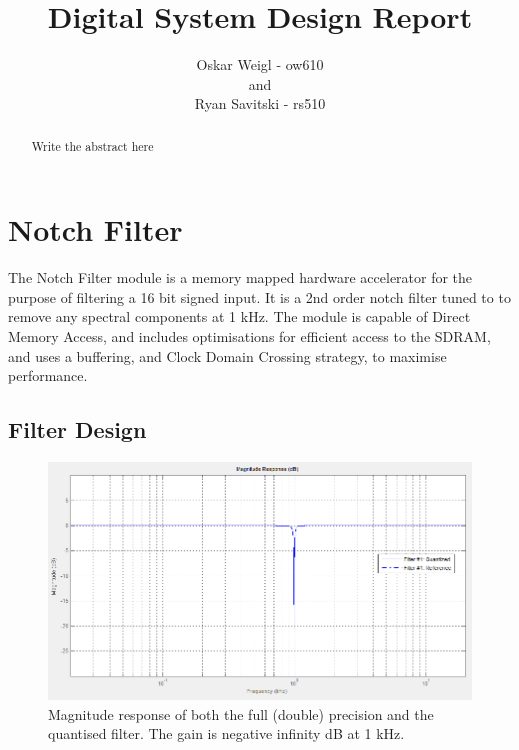 \documentclass[]{article}
\title{Digital System Design Report}
\author{Oskar Weigl - ow610\\ and \\ Ryan Savitski - rs510}
\begin{document}
\maketitle

\begin{abstract}
	Write the abstract here
\end{abstract}

\tableofcontents
\clearpage


\section{Notch Filter} %
\label{sec:notch_filter}

The Notch Filter module is a memory mapped hardware accelerator for the purpose of filtering a 16 bit signed input. It is a 2nd order notch filter tuned to to remove any spectral components at 1 kHz.
The module is capable of Direct Memory Access, and includes optimisations for efficient access to the SDRAM, and uses a buffering, and Clock Domain Crossing strategy, to maximise performance.


\subsection{Filter Design} %
\label{sub:filter_design}

\begin{figure}[htbp]
	\begin{center}
		\includegraphics[width = \textwidth]{matlabmagnitudelog.PNG}
	\end{center}
	\caption{Magnitude response of both the full (double) precision and the quantised filter. The gain is negative infinity dB at 1 kHz.}
	\label{fig:matlabmagnitudelog}
\end{figure}
\end{document}

